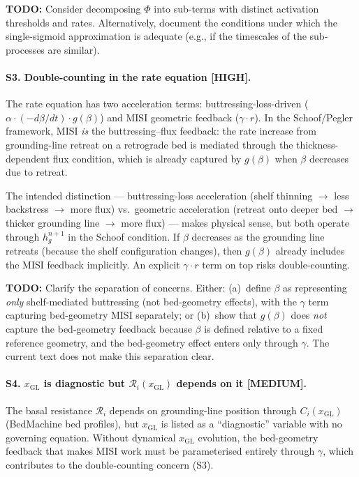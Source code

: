 \documentclass[11pt]{article}
\theoremstyle{definition}
\begin{document}
\textbf{TODO:} Consider decomposing $\Phi$ into sub-terms with distinct activation thresholds and rates.  Alternatively, document the conditions under which the single-sigmoid approximation is adequate (e.g., if the timescales of the sub-processes are similar).

\paragraph{S3. Double-counting in the rate equation [HIGH].}
The rate equation has two acceleration terms: buttressing-loss-driven ($\alpha \cdot (-d\beta/dt) \cdot g(\beta)$) and MISI geometric feedback ($\gamma \cdot r$).  In the Schoof/Pegler framework, MISI \emph{is} the buttressing--flux feedback: the rate increase from grounding-line retreat on a retrograde bed is mediated through the thickness-dependent flux condition, which is already captured by $g(\beta)$ when $\beta$ decreases due to retreat.

The intended distinction --- buttressing-loss acceleration (shelf thinning $\to$ less backstress $\to$ more flux) vs.\ geometric acceleration (retreat onto deeper bed $\to$ thicker grounding line $\to$ more flux) --- makes physical sense, but both operate through $h_g^{n+1}$ in the Schoof condition.  If $\beta$ decreases as the grounding line retreats (because the shelf configuration changes), then $g(\beta)$ already includes the MISI feedback implicitly.  An explicit $\gamma \cdot r$ term on top risks double-counting.

\textbf{TODO:} Clarify the separation of concerns.  Either: (a)~define $\beta$ as representing \emph{only} shelf-mediated buttressing (not bed-geometry effects), with the $\gamma$ term capturing bed-geometry MISI separately; or (b)~show that $g(\beta)$ does \emph{not} capture the bed-geometry feedback because $\beta$ is defined relative to a fixed reference geometry, and the bed-geometry effect enters only through $\gamma$.  The current text does not make this separation clear.

\paragraph{S4. $x_{\text{GL}}$ is diagnostic but $\mathcal{R}_i(x_{\text{GL}})$ depends on it [MEDIUM].}
The basal resistance $\mathcal{R}_i$ depends on grounding-line position through $C_i(x_{\text{GL}})$ (BedMachine bed profiles), but $x_{\text{GL}}$ is listed as a ``diagnostic'' variable with no governing equation.  Without dynamical $x_{\text{GL}}$ evolution, the bed-geometry feedback that makes MISI work must be parameterised entirely through $\gamma$, which contributes to the double-counting concern (S3).
\end{document}
